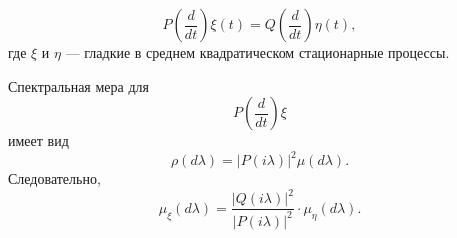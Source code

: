 \begin{equation*}
  P \left( \frac{d}{dt} \right) \xi \left( t \right) =
  Q \left( \frac{d}{dt} \right) \eta \left( t \right),
\end{equation*}
где $ \xi $ и $ \eta $ --- гладкие в среднем квадратическом стационарные процессы.

Спектральная мера для
\begin{equation*}
  P \left( \frac{d}{dt} \right) \xi
\end{equation*}
имеет вид
\begin{equation*}
  \rho \left( d \lambda \right) =
  \left| P \left( i \lambda \right) \right|^2 \mu \left( d \lambda \right).
\end{equation*}
Следовательно,
\begin{equation*}
  \mu_{ \xi } \left( d \lambda \right) =
  \frac{ \left| Q \left( i \lambda \right) \right|^2}{ \left| P \left( i \lambda \right) \right|^2} \cdot
  \mu_{ \eta } \left( d \lambda \right).
\end{equation*}
